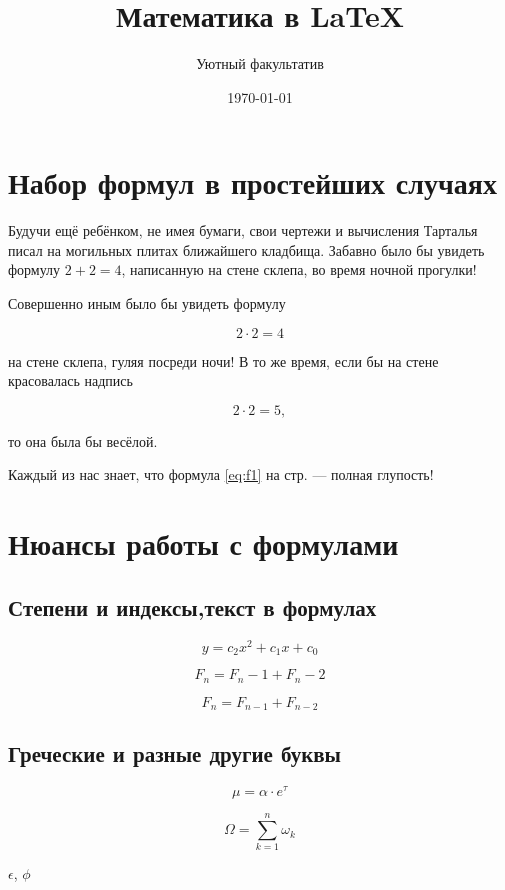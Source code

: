 \documentclass[12pt, a4paper]{article}
\author{Уютный факультатив}
\title{Математика в \LaTeX}
\date{\today}
\begin{document}

\maketitle


\section{Набор формул в простейших случаях}

Будучи ещё ребёнком, не имея бумаги, свои чертежи и вычисления Тарталья писал на  могильных плитах ближайшего кладбища. Забавно было бы увидеть формулу $2 + 2 = 4$, написанную на стене склепа, во время ночной прогулки!

Совершенно иным было бы увидеть формулу 

\[2 \cdot 2 = 4\]

на стене склепа, гуляя посреди ночи! В то же время, если бы на стене красовалась надпись 

\begin{equation}\label{eq:f1}
2 \cdot 2 = 5,
\end{equation}

то она была бы весёлой.

Каждый из нас знает, что формула \eqref{eq:f1}  на стр. \pageref{eq:f1} --- полная глупость!


\section{Нюансы работы с формулами}

\subsection{Степени и индексы,текст в формулах}

\[ y = c_2 x^2 + c_1 x + c_0 \] 

\[ F_n = F_n-1 + F_n-2 \]     %

\[ F_n = F_{n-1} + F_{n-2} \] %


\subsection{Греческие и разные другие буквы}

\[ \mu = \alpha \cdot e^{\tau} \]

\[ \Omega = \sum_{k=1}^{n} \omega_k \]


$\epsilon$, $\phi$          %
\end{document}
